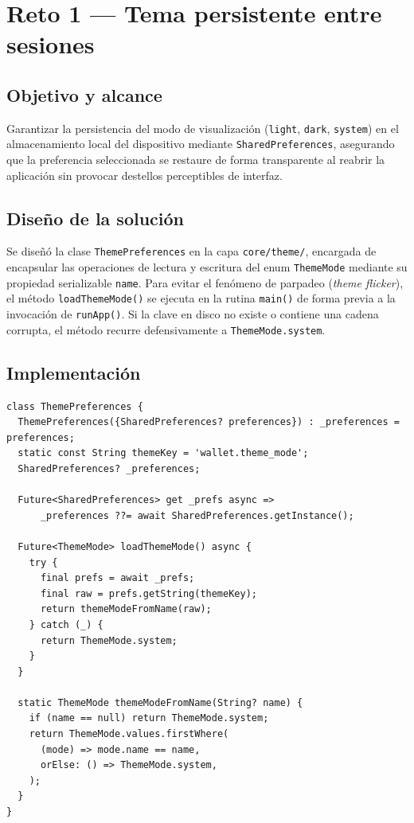 \documentclass[12pt,a4paper]{article}
\begin{document}
\section{Reto 1 — Tema persistente entre sesiones}

\subsection{Objetivo y alcance}
Garantizar la persistencia del modo de visualización (\texttt{light}, \texttt{dark}, \texttt{system}) en el almacenamiento local del dispositivo mediante \texttt{SharedPreferences}, asegurando que la preferencia seleccionada se restaure de forma transparente al reabrir la aplicación sin provocar destellos perceptibles de interfaz.

\subsection{Diseño de la solución}
Se diseñó la clase \texttt{ThemePreferences} en la capa \texttt{core/theme/}, encargada de encapsular las operaciones de lectura y escritura del enum \texttt{ThemeMode} mediante su propiedad serializable \texttt{name}. Para evitar el fenómeno de parpadeo (\textit{theme flicker}), el método \texttt{loadThemeMode()} se ejecuta en la rutina \texttt{main()} de forma previa a la invocación de \texttt{runApp()}. Si la clave en disco no existe o contiene una cadena corrupta, el método recurre defensivamente a \texttt{ThemeMode.system}.

\subsection{Implementación}
\begin{lstlisting}[caption={Persistencia y fallback defensivo en ThemePreferences.}]
class ThemePreferences {
  ThemePreferences({SharedPreferences? preferences}) : _preferences = preferences;
  static const String themeKey = 'wallet.theme_mode';
  SharedPreferences? _preferences;

  Future<SharedPreferences> get _prefs async =>
      _preferences ??= await SharedPreferences.getInstance();

  Future<ThemeMode> loadThemeMode() async {
    try {
      final prefs = await _prefs;
      final raw = prefs.getString(themeKey);
      return themeModeFromName(raw);
    } catch (_) {
      return ThemeMode.system;
    }
  }

  static ThemeMode themeModeFromName(String? name) {
    if (name == null) return ThemeMode.system;
    return ThemeMode.values.firstWhere(
      (mode) => mode.name == name,
      orElse: () => ThemeMode.system,
    );
  }
}
\end{lstlisting}
\end{document}
